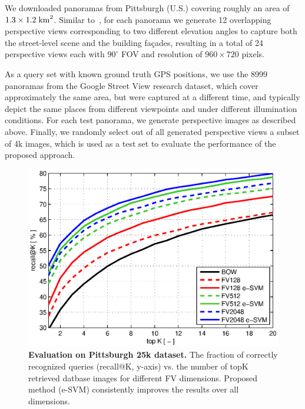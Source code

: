 \documentclass[table]{article} %
\begin{document}
		We downloaded panoramas from Pittsburgh (U.S.) covering roughly an area of $1.3 \times 1.2 \; {\rm km}^2$. Similar to~\cite{Chen11}, for each panorama we generate 12 overlapping perspective views corresponding to two different elevation angles to capture both the street-level scene and the building fa\c{c}ades, resulting in a total of 24 perspective views each with $90^\circ$ FOV and resolution of $960 \times 720$ pixels.

		As a query set with known ground truth GPS positions, we use the 8999 panoramas from the Google Street View research dataset, which cover approximately the same area, but were captured at a different time, and typically depict the same places from different viewpoints and under different illumination conditions. For each test panorama, we generate perspective images as described above. Finally, we randomly select out of all generated perspective views a subset of 4k images, which is used as a test set to evaluate the performance of the proposed approach.



\begin{figure}[t!]
    \centering
    \includegraphics[width=\linewidth]{imgs/plotPitt25k}    
    \caption{
        \textbf{Evaluation on Pittsburgh 25k \cite{Gronat13} dataset.} The fraction of correctly recognized queries (recall@K, y-axis) vs. the number of topK retrieved datbase images for different FV dimensions. Proposed method (e-SVM) consistently improves the results over all dimensions.
    }
    \label{fig:recall}
\end{figure}

\end{document}

